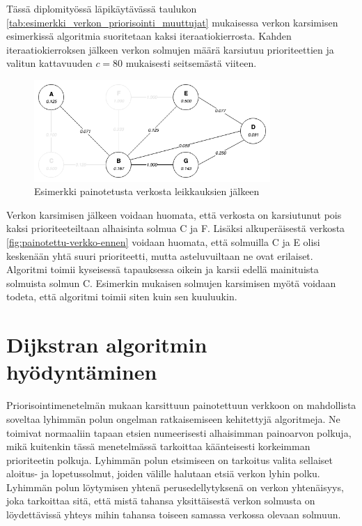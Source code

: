   Tässä diplomityössä läpikäytävässä taulukon \ref{tab:esimerkki_verkon_priorisointi_muuttujat} mukaisessa verkon karsimisen esimerkissä algoritmia suoritetaan kaksi iteraatiokierrosta.
  Kahden iteraatiokierroksen jälkeen verkon solmujen määrä karsiutuu prioriteettien ja valitun kattavuuden \(c=80\) mukaisesti seitsemästä viiteen.

  \begin{figure}[H]
    \centering
    \includegraphics[width=0.8\textwidth]{assets/painotettu-verkko-jalkeen.png}
    \caption{Esimerkki painotetusta verkosta leikkauksien jälkeen}
    \label{fig:painotettu-verkko-jalkeen}
  \end{figure}

  Verkon karsimisen jälkeen voidaan huomata, että verkosta on karsiutunut pois kaksi prioriteeteiltaan alhaisinta solmua C ja F.
  Lisäksi alkuperäisestä verkosta \ref{fig:painotettu-verkko-ennen} voidaan huomata, että solmuilla C ja E olisi keskenään yhtä suuri prioriteetti, mutta asteluvuiltaan ne ovat erilaiset.
  Algoritmi toimii kyseisessä tapauksessa oikein ja karsii edellä mainituista solmuista solmun C.
  Esimerkin mukaisen solmujen karsimisen myötä voidaan todeta, että algoritmi toimii siten kuin sen kuuluukin.

\section{Dijkstran algoritmin hyödyntäminen} \label{ch:10_dijkstran_algoritmin_hyodyntaminen}

  Priorisointimenetelmän mukaan karsittuun painotettuun verkkoon on mahdollista soveltaa lyhimmän polun ongelman ratkaisemiseen kehitettyjä algoritmeja.
  Ne toimivat normaaliin tapaan etsien numeerisesti alhaisimman painoarvon polkuja, mikä kuitenkin tässä menetelmässä tarkoittaa käänteisesti korkeimman prioriteetin polkuja.
  Lyhimmän polun etsimiseen on tarkoitus valita sellaiset aloitus- ja lopetussolmut, joiden välille halutaan etsiä verkon lyhin polku.
  Lyhimmän polun löytymisen yhtenä perusedellytyksenä on verkon yhtenäisyys, joka tarkoittaa sitä, että mistä tahansa yksittäisestä verkon solmusta on löydettävissä yhteys mihin tahansa toiseen samassa verkossa olevaan solmuun.

